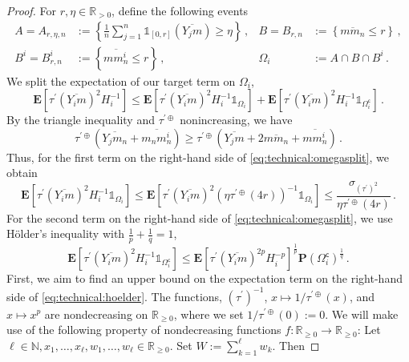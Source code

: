 \documentclass{article}
\newcommand{\N}{\mathbb{N}}
\newcommand{\R}{\mathbb{R}}
\newcommand{\Rp}{\R_{\geq0}}
\newcommand{\Rpp}{\R_{>0}}
\newcommand{\lcb}{\left\lbrace} %
\newcommand{\rcb}{\right\rbrace} %
\newcommand{\cb}[1]{\lcb #1 \rcb} %
\newcommand{\lab}{\left[} %
\newcommand{\rab}{\right]} %
\newcommand{\ab}[1]{\lab #1 \rab} %
\newcommand{\abOf}[1]{\!\ab{#1}} %
\newcommand{\lb}{\left(} %
\newcommand{\rb}{\right)} %
\newcommand{\br}[1]{\lb #1 \rb} %
\newcommand{\brOf}[1]{\!\br{#1}} %
\renewcommand{\Pr}{\mathbf{P}} %
\newcommand{\PrOf}[1]{\Pr\brOf{#1}}
\newcommand{\E}{\mathbf{E}} %
\newcommand{\EOf}[1]{\E\abOf{#1}}
\newcommand{\pr}{^\prime}
\newcommand{\compl}{^\mathsf{c}}%
\newcommand{\ind}{\mathds{1}}%
\newcommand{\indOf}[1]{\ind_{\!#1}}%
\newcommand{\eqcm}{\,,} %
\newcommand{\eqfs}{\,.}
\newcommand{\ol}[2]{\overline{#1#2}}
\newcommand{\dtran}{\tau\pr}
\newcommand{\ddrtran}{\tau^{\prime\oplus}}
\newcommand{\invdtran}{(\tau\pr)^{-1}}
\begin{document}
%
\begin{proof}
    For $r,\eta\in\Rpp$, define the following events
    \begin{align}
        A = A_{r,\eta,n} &:= \cb{\frac1n \sum_{j=1}^n \ind_{[0, r]}(\ol {Y_j}{m}) \geq \eta}
        \eqcm
        &
        B = B_{r,n} &:= \cb{\ol m{m_n} \leq r}
        \eqcm
        \\
        B^i = B^i_{r,n} &:= \cb{\ol m{m_n^i} \leq r}
        \eqcm
        &
        \Omega_i &:= A \cap B \cap B^i
        \eqfs
    \end{align}
    We split the expectation of our target term on $\Omega_i$,
    \begin{equation}\label{eq:technical:omegasplit}
        \EOf{\dtran(\ol{Y_i}m)^2 H_i^{-1}}
        \leq
        \EOf{\dtran(\ol{Y_i}m)^2 H_i^{-1} \indOf{\Omega_i}}
        +
        \EOf{\dtran(\ol{Y_i}m)^2 H_i^{-1} \indOf{\Omega_i\compl}}
        \eqfs
    \end{equation}
    By the triangle inequality and $\ddrtran$ nonincreasing, we have
    \begin{equation}
        \ddrtran(\ol{Y_j}{m_n}+\ol{m_n}{m_n^i}) \geq \ddrtran(\ol{Y_j}{m}+2\ol{m}{m_n}+\ol{m}{m_n^i})
        \eqfs
    \end{equation}
    Thus, for the first term on the right-hand side of \eqref{eq:technical:omegasplit}, we obtain
    \begin{equation}
        \EOf{\dtran(\ol{Y_i}m)^2 H_i^{-1} \indOf{\Omega_i}}
        \leq
        \EOf{\dtran(\ol{Y_i}m)^2 \br{\eta \ddrtran(4r)}^{-1} \indOf{\Omega_i}}
        \leq
        \frac{\sigma_{(\dtran)^2}}{\eta \ddrtran(4r)}
        \eqfs
    \end{equation}
    For the second term on the right-hand side of \eqref{eq:technical:omegasplit}, we use H\"older's inequality with $\frac1p + \frac1q = 1$,
    \begin{equation}\label{eq:technical:hoelder}
        \EOf{\dtran(\ol{Y_i}m)^2 H_i^{-1} \indOf{\Omega_i\compl}}
        \leq
        \EOf{\dtran(\ol{Y_i}m)^{2p} H_i^{-p}}^{\frac1p} \PrOf{\Omega_i\compl}^{\frac1q}
        \eqfs
    \end{equation}
    First, we aim to find an upper bound on the expectation term on the right-hand side of \eqref{eq:technical:hoelder}.
    The functions, $\invdtran$, $x\mapsto 1/\ddrtran(x)$, and $x\mapsto x^p$ are nondecreasing on $\Rp$, where we set $1/\ddrtran(0) := 0$.
    We will make use of the following property of nondecreasing functions $f \colon \Rp\to\Rp$: Let $\ell\in\N, x_1, \dots, x_\ell, w_1, \dots, w_\ell \in \Rp$. Set $W := \sum_{k=1}^\ell w_k$. Then

\end{proof}
\end{document}
